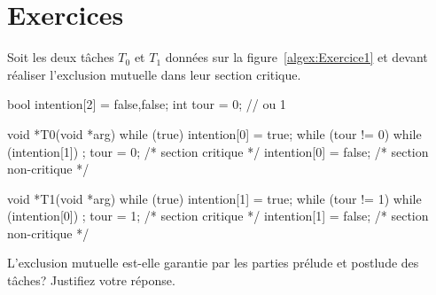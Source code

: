 \section{Exercices}

\startexercice

Soit les deux tâches $T_0$ et $T_1$ données sur la figure~\ref{algex:Exercice1} et devant réaliser l'exclusion mutuelle dans leur section critique.

\begin{codeblock}[label=algex:Exercice1, title={Exercice 1}]
bool intention[2] = {false,false};
int tour = 0; // ou 1

void *T0(void *arg)
{
  while (true) {
    intention[0] = true;
    while (tour != 0) {
      while (intention[1])
        ;
      tour = 0;
    }
    /* section critique */
    intention[0] = false;
    /* section non-critique */
  }
}

void *T1(void *arg)
{
  while (true) {
    intention[1] = true;
    while (tour != 1) {
      while (intention[0])
        ;
      tour = 1;
    }
    /* section critique */
    intention[1] = false;
    /* section non-critique */
  }
}
\end{codeblock}

L'exclusion mutuelle est-elle garantie par les parties prélude et postlude des tâches? Justifiez votre réponse.
